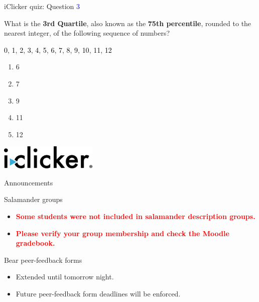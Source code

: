 \documentclass[ignorenonframetext,]{beamer}
\providecommand{\tightlist}{%
  \setlength{\itemsep}{0pt}\setlength{\parskip}{0pt}}
\begin{document}
\begin{frame}{iClicker quiz: Question \textcolor{blue}{3}}

What is the \textbf{3rd Quartile}, also known as the \textbf{75th
percentile}, rounded to the nearest integer, of the following sequence
of numbers?

\textcolor{black}{0}, \textcolor{black}{1}, \textcolor{black}{2},
\textcolor{black}{3}, \textcolor{black}{4}, \textcolor{black}{5},
\textcolor{black}{6}, \textcolor{black}{7}, \textcolor{black}{8},
\textcolor{black}{9}, \textcolor{black}{10}, \textcolor{black}{11},
\textcolor{black}{12}

\begin{enumerate}[A]
\item 6
\item 7
\item 9
\item 11
\item 12
\end{enumerate}

\begin{multicols}{2}
\null \vfill
\vfill \null
\columnbreak
\includegraphics[width = 0.35\textwidth]{../slide_images/iClicker_logo.png}

\end{multicols}

\end{frame}

\begin{frame}{Announcements}

\begin{block}{Salamander groups}

\begin{itemize}
\tightlist
\item
  \textbf{\textcolor{red}{Some students were not included in salamander description groups.}}
\item
  \textbf{\textcolor{red}{Please verify your group membership and check the Moodle gradebook.}}
\end{itemize}

\end{block}

\begin{block}{Bear peer-feedback forms}

\begin{itemize}
\tightlist
\item
  Extended until tomorrow night.
\item
  Future peer-feedback form deadlines will be enforced.
\end{itemize}

\end{block}

\end{frame}
\end{document}
